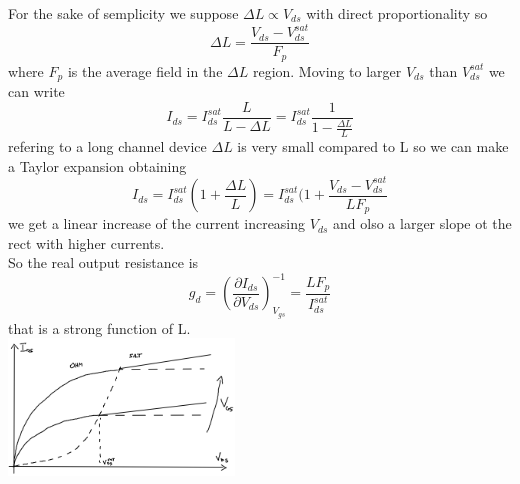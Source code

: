 For the sake of semplicity we suppose $\Delta L\propto V_{ds}$ with direct proportionality so
\begin{equation}
\Delta L =\frac{V_{ds}-V_{ds}^{sat}}{F_p}
\end{equation}
where $F_p$ is the average field in the $\Delta L$ region. Moving to larger $V_{ds}$ than $V_{ds}^{sat}$ we can write 
\begin{equation}
I_{ds}=I_{ds}^{sat}\frac{L}{L-\Delta L }=I_{ds}^{sat}\frac{1}{1-\frac{\Delta L}{L}} 
\end{equation}
refering to a long channel device $\Delta L$ is very small compared to L so we can make a Taylor expansion obtaining 
\begin{equation}
I_{ds}=I_{ds}^{sat}(1+\frac{\Delta L}{L})=I_{ds}^{sat}(1+\frac{V_{ds}-V_{ds}^{sat}}{LF_p}
\end{equation}
we get a linear increase of the current increasing $V_{ds}$ and olso a larger slope ot the rect with higher currents.\\
So the real output resistance is 
\begin{equation}
g_d=\left(\frac{\partial I_{ds}}{\partial V_{ds}}\right)^{-1}_{V_{gs}}=\frac{LF_p}{I_{ds}^{sat}}
\end{equation}
that is a strong function of L.\\

\centering
\includegraphics[width=0.45\textwidth]{early1.png}\\
\raggedright


